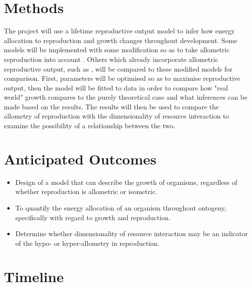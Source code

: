\section*{Methods}
The project will use a lifetime reproductive output model to infer how energy allocation to reproduction and growth changes throughout development.  Some models will be implemented with some modification so as to take allometric reproduction into account \citep{Charnov2001, West2001}.  Others which already incorporate allometric reproductive output, such as \cite{Burger2019}, will be compared to these modified models for comparison. First, parameters will be optimised so as to maximise reproductive output, then the model will be fitted to data in order to compare how "real world" growth compares to the purely theoretical case and what inferences can be made based on the results.
\newline
The results will then be used to compare the allometry of reproduction with the dimensionality of resource interaction to examine the possibility of a relationship between the two.  

\section*{Anticipated Outcomes}
\begin{itemize}
	\item Design of a model that can describe the growth of organisms, regardless of whether reproduction is allometric or isometric.
	\item To quantify the energy allocation of an organism throughout ontogeny, specifically with regard to growth and reproduction.
	\item Determine whether dimensionality of resource interaction may be an indicator of the hypo-  or hyper-allometry in reproduction.
\end{itemize}

\section*{Timeline}


